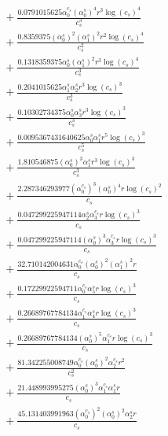 \documentclass[10pt]{article}
\begin{document}
\begin{align*}
&{}  + \frac{0.0791015625 \alpha_{0}^{c_s} \left(\alpha_{0}^s\right)^{4} r^{3} \log{\left(c_{s} \right)}^{4}}{c_{s}^{3}} \\
&{}  + \frac{0.8359375 \left(\alpha_{0}^s\right)^{2} \left(\alpha_{1}^s\right)^{2} r^{2} \log{\left(c_{s} \right)}^{4}}{c_{s}^{2}} \\
&{}  + \frac{0.1318359375 \alpha_{0}^s \left(\alpha_{1}^s\right)^{2} r^{3} \log{\left(c_{s} \right)}^{4}}{c_{s}^{3}} \\
&{}  + \frac{0.2041015625 \alpha_{1}^s \alpha_{2}^s r^{3} \log{\left(c_{s} \right)}^{3}}{c_{s}^{3}} \\
&{}  + \frac{0.10302734375 \alpha_{0}^s \alpha_{3}^s r^{3} \log{\left(c_{s} \right)}^{3}}{c_{s}^{3}} \\
&{}  + \frac{0.0095367431640625 \alpha_{0}^s \alpha_{1}^s r^{5} \log{\left(c_{s} \right)}^{3}}{c_{s}^{5}} \\
&{}  + \frac{1.810546875 \left(\alpha_{0}^s\right)^{3} \alpha_{1}^s r^{3} \log{\left(c_{s} \right)}^{3}}{c_{s}^{3}} \\
&{}  + \frac{2.287346293977 \left(\alpha_{0}^{c_s}\right)^{3} \left(\alpha_{0}^s\right)^{4} r \log{\left(c_{s} \right)}^{2}}{c_{s}} \\
&{}  + \frac{0.047299225947114 \alpha_{2}^s \alpha_{3}^{c_s} r \log{\left(c_{s} \right)}^{3}}{c_{s}} \\
&{}  + \frac{0.047299225947114 \left(\alpha_{0}^s\right)^{3} \alpha_{3}^{c_s} r \log{\left(c_{s} \right)}^{3}}{c_{s}} \\
&{}  + \frac{32.710142004631 \alpha_{0}^{c_s} \left(\alpha_{0}^s\right)^{2} \left(\alpha_{1}^s\right)^{2} r}{c_{s}} \\
&{}  + \frac{0.17229922594711 \alpha_{0}^{c_s} \alpha_{5}^s r \log{\left(c_{s} \right)}^{3}}{c_{s}} \\
&{}  + \frac{0.26689767784134 \alpha_{1}^{c_s} \alpha_{4}^s r \log{\left(c_{s} \right)}^{3}}{c_{s}} \\
&{}  + \frac{0.26689767784134 \left(\alpha_{0}^s\right)^{5} \alpha_{1}^{c_s} r \log{\left(c_{s} \right)}^{3}}{c_{s}} \\
&{}  + \frac{81.342255008749 \alpha_{0}^{c_s} \left(\alpha_{0}^s\right)^{2} \alpha_{2}^{c_s} r^{2}}{c_{s}^{2}} \\
&{}  + \frac{21.448993995275 \left(\alpha_{0}^s\right)^{3} \alpha_{1}^{c_s} \alpha_{1}^s r}{c_{s}} \\
&{}  + \frac{45.131403991963 \left(\alpha_{0}^{c_s}\right)^{2} \left(\alpha_{0}^s\right)^{2} \alpha_{2}^s r}{c_{s}} \\

\end{align*}
\end{document}
